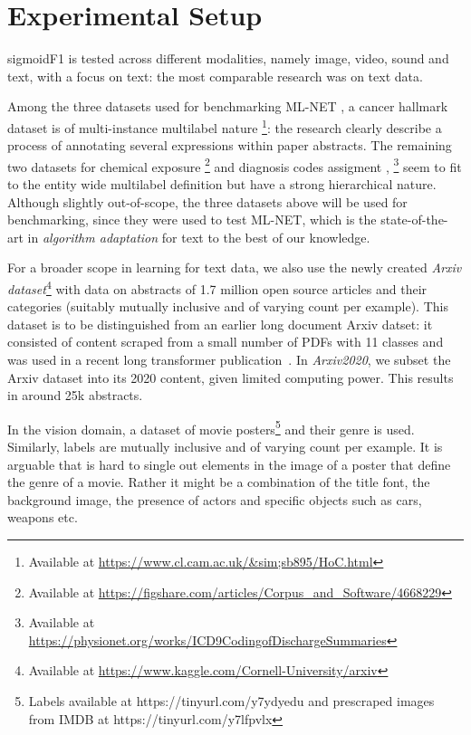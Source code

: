 
\section{Experimental Setup}
\label{sec:orgb44ba25}

sigmoidF1 is tested across different modalities, namely image, video, sound and text, with a focus on text: the most comparable research was on text data.



Among the three datasets used for benchmarking ML-NET \cite{multitaskLabel}, a cancer hallmark dataset is of multi-instance multilabel nature \cite{cancerHallmarks}\footnote{Available at \url{https://www.cl.cam.ac.uk/&sim;sb895/HoC.html}}: the research clearly describe a process of annotating several expressions within paper abstracts. The remaining two datasets for chemical exposure \cite{chemExposure}\footnote{Available at \url{https://figshare.com/articles/Corpus_and_Software/4668229}} and diagnosis codes assigment \cite{diagnosisCode}, \footnote{Available at \url{https://physionet.org/works/ICD9CodingofDischargeSummaries}} seem to fit to the entity wide multilabel definition but have a strong hierarchical nature. Although slightly out-of-scope, the three datasets above will be used for benchmarking, since they were used to test ML-NET, which is the state-of-the-art in \emph{algorithm adaptation} for text to the best of our knowledge.

For a broader scope in learning for text data, we also use the newly created \emph{Arxiv dataset}\footnote{Available at \url{https://www.kaggle.com/Cornell-University/arxiv}} with data on abstracts of 1.7 million open source articles and their categories (suitably mutually inclusive and of varying count per example). This dataset is to be distinguished from an earlier long document Arxiv datset: it consisted of content scraped from a small number of PDFs with 11 classes \cite{oldArxiv} and was used in a recent long transformer publication~\cite{bigBird}. In \textit{Arxiv2020}, we subset the Arxiv dataset into its 2020 content, given limited computing power. This results in around 25k abstracts.

In the vision domain, a dataset of movie posters\footnote{Labels available at https://tinyurl.com/y7ydyedu and prescraped images from IMDB at https://tinyurl.com/y7lfpvlx} and their genre is used. Similarly, labels are mutually inclusive and of varying count per example. It is arguable that is hard to single out elements in the image of a poster that define the genre of a movie. Rather it might be a combination of the title font, the background image, the presence of actors and specific objects such as cars, weapons etc. 

